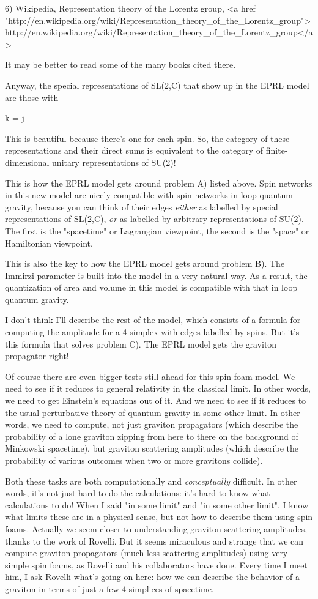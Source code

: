 6) Wikipedia, Representation theory of the Lorentz group,
<a href = "http://en.wikipedia.org/wiki/Representation_theory_of_the_Lorentz_group">http://en.wikipedia.org/wiki/Representation_theory_of_the_Lorentz_group</a>

It may be better to read some of the many books cited there.

Anyway, the special representations of SL(2,C) that show up in the
EPRL model are those with 

k = \gamma  j

This is beautiful because there's one for each spin.  So, the category
of these representations and their direct sums is equivalent to the
category of finite-dimensional unitary representations of SU(2)!

This is how the EPRL model gets around problem A) listed above.  Spin
networks in this new model are nicely compatible with spin networks in
loop quantum gravity, because you can think of their edges
\emph{either} as labelled by special representations of SL(2,C),
\emph{or} as labelled by arbitrary representations of SU(2).  The
first is the "spacetime" or Lagrangian viewpoint, the second
is the "space" or Hamiltonian viewpoint.

This is also the key to how the EPRL model gets around problem B).  The
Immirzi parameter is built into the model in a very natural way.  As a
result, the quantization of area and volume in this model is
compatible with that in loop quantum gravity.

I don't think I'll describe the rest of the model, which consists of a
formula for computing the amplitude for a 4-simplex with edges
labelled by spins.  But it's this formula that solves problem C).  The
EPRL model gets the graviton propagator right!

Of course there are even bigger tests still ahead for this spin foam
model.  We need to see if it reduces to general relativity in the
classical limit.  In other words, we need to get Einstein's equations
out of it.  And we need to see if it reduces to the usual perturbative
theory of quantum gravity in some other limit.  In other words, we
need to compute, not just graviton propagators (which describe the
probability of a lone graviton zipping from here to there on the
background of Minkowski spacetime), but graviton scattering amplitudes
(which describe the probability of various outcomes when two or more
gravitons collide).  

Both these tasks are both computationally and \emph{conceptually}
difficult.  In other words, it's not just hard to do the calculations:
it's hard to know what calculations to do!  When I said "in some
limit" and "in some other limit", I know what limits
these are in a physical sense, but not how to describe them using spin
foams.  Actually we seem closer to understanding graviton scattering
amplitudes, thanks to the work of Rovelli.  But it seems miraculous
and strange that we can compute graviton propagators (much less
scattering amplitudes) using very simple spin foams, as Rovelli and
his collaborators have done.  Every time I meet him, I ask Rovelli
what's going on here: how we can describe the behavior of a graviton
in terms of just a few 4-simplices of spacetime.

